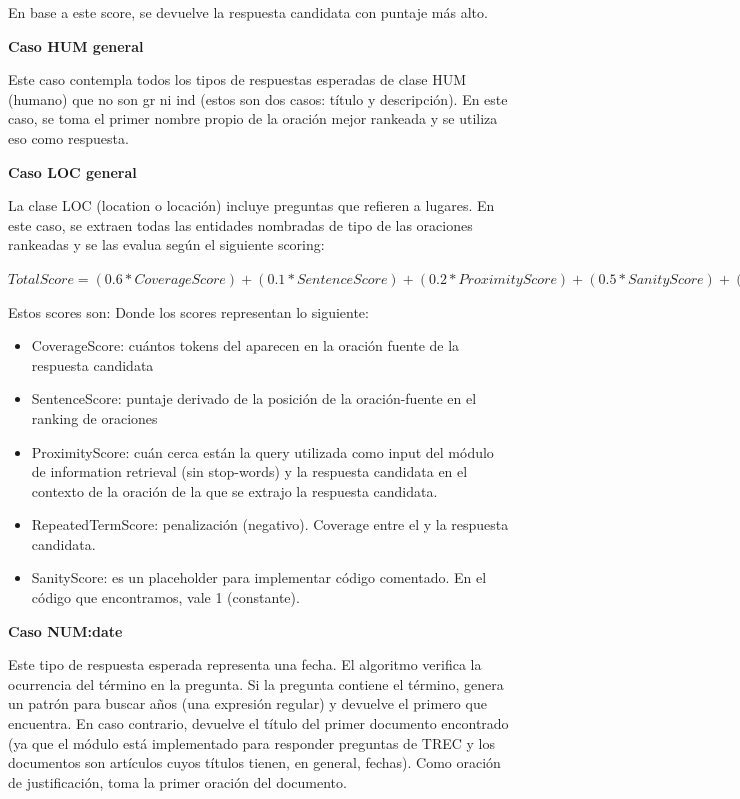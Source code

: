 En base a este score, se devuelve la respuesta candidata con puntaje más alto. \newline

\textbf{Caso HUM general} \newline

Este caso contempla todos los tipos de respuestas esperadas de clase HUM (humano) que no son gr ni ind (estos son dos casos: título y descripción). En este caso, se toma el primer nombre propio de la oración mejor rankeada y se utiliza eso como respuesta. \newline

\textbf{Caso LOC general} \newline

La clase LOC (location o locación) incluye preguntas que refieren a lugares.  En este caso, se extraen todas las entidades nombradas de tipo  de las oraciones rankeadas y se las evalua según el siguiente scoring:

$TotalScore = (0.6 * CoverageScore) + (0.1 * SentenceScore) + (0.2 * ProximityScore)	+ (0.5 * SanityScore) + (0.3 * RepeatedTermScore)$ \newline

Estos scores son:
Donde los scores representan lo siguiente:
\begin{itemize}
  \item CoverageScore: cuántos tokens del  aparecen en la oración fuente de la respuesta candidata 
  \item SentenceScore: puntaje derivado de la posición de la oración-fuente en el ranking de oraciones
  \item ProximityScore: cuán cerca están la query utilizada como input del módulo de information retrieval (sin stop-words) y la respuesta candidata en el contexto de la oración de la que se extrajo la respuesta candidata.
  \item RepeatedTermScore: penalización (negativo). Coverage entre el  y la respuesta candidata.
  \item SanityScore: es un placeholder para implementar código comentado. En el código que encontramos, vale 1 (constante).
\end{itemize}


\textbf{Caso NUM:date} \newline

Este tipo de respuesta esperada representa una fecha. El algoritmo verifica la ocurrencia del término  en la pregunta. Si la pregunta contiene el término, genera un patrón para buscar años (una expresión regular) y devuelve el primero que encuentra. En caso contrario, devuelve el título del primer documento encontrado (ya que el módulo está implementado para responder preguntas de TREC y los documentos son artículos cuyos títulos tienen, en general, fechas). Como oración de justificación, toma la primer oración del documento.

